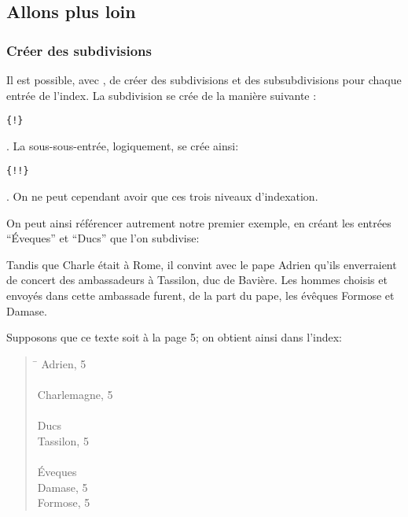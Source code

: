 \subsection{Allons plus loin}
\subsubsection{Créer des subdivisions}

Il est possible, avec ,  de créer des subdivisions et des subsubdivisions  pour chaque entrée de l'index. La subdivision se crée de la manière suivante : \begin{english}\verb|{|\verb|!|\verb|}|\end{english}. La sous-sous-entrée, logiquement, se crée ainsi: \begin{english}\verb|{|\verb|!|\verb|!|\verb|}|\end{english}. On ne peut cependant avoir que ces trois niveaux d'indexation.

On peut ainsi référencer autrement notre premier exemple, en créant les entrées \enquote{Éveques} et \enquote{Ducs} que l'on subdivise:

\begin{latexcode}
Tandis que Charle était à Rome, il convint 
avec le pape Adrien qu’ils enverraient de concert 
des ambassadeurs à Tassilon, duc de Bavière.
\textelp{}
Les hommes choisis et envoyés dans cette ambassade furent, de la 
part du pape, les évêques Formose
et Damase\textelp{}.
\end{latexcode}


Supposons que ce texte soit à la page 5; on obtient ainsi dans l'index:
\begin{quotation}
\begin{tabbing}
\hspace{0,5cm}  \= \kill
Adrien, 5 \\
\\
Charlemagne, 5 \\
\\
Ducs \\
\> Tassilon, 5\\
\\
Éveques \\
\> Damase, 5\\
\> Formose, 5\\
\end{tabbing}
\end{quotation}



